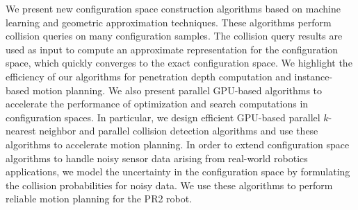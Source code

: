 We present new configuration space construction algorithms based on machine learning and geometric approximation techniques. These algorithms perform collision queries on many configuration samples. The collision query results
are used as input to compute an approximate representation for the configuration space, which quickly converges to the exact configuration space. We highlight the efficiency of our algorithms for penetration depth computation and
instance-based motion planning. We also present parallel GPU-based algorithms to accelerate the performance of optimization and search computations in configuration spaces. In particular, we design efficient GPU-based parallel $k$-nearest neighbor and parallel collision detection algorithms and use these algorithms
to accelerate motion planning. In order to extend configuration space algorithms to handle noisy sensor data arising from real-world robotics applications,
we model the uncertainty in the configuration space by formulating the collision probabilities for noisy data.
We use these algorithms to perform reliable motion planning for the PR2 robot.

